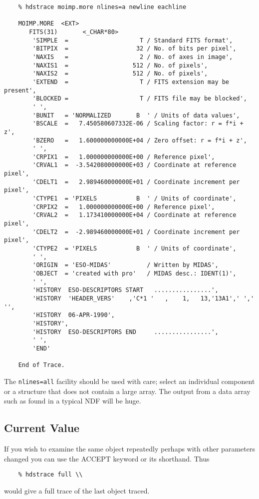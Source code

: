 \small
\begin{verbatim}
    % hdstrace moimp.more nlines=a newline eachline

    MOIMP.MORE  <EXT>
       FITS(31)       <_CHAR*80>      
        'SIMPLE  =                    T / Standard FITS format',
        'BITPIX  =                   32 / No. of bits per pixel',
        'NAXIS   =                    2 / No. of axes in image',
        'NAXIS1  =                  512 / No. of pixels',
        'NAXIS2  =                  512 / No. of pixels',
        'EXTEND  =                    T / FITS extension may be present',
        'BLOCKED =                    T / FITS file may be blocked',
        ' ',
        'BUNIT   = 'NORMALIZED       B  ' / Units of data values',
        'BSCALE  =   7.450580607332E-06 / Scaling factor: r = f*i + z',
        'BZERO   =   1.600000000000E+04 / Zero offset: r = f*i + z',
        ' ',
        'CRPIX1  =   1.000000000000E+00 / Reference pixel',
        'CRVAL1  =  -3.542080000000E+03 / Coordinate at reference pixel',
        'CDELT1  =   2.989460000000E+01 / Coordinate increment per pixel',
        'CTYPE1  = 'PIXELS           B  ' / Units of coordinate',
        'CRPIX2  =   1.000000000000E+00 / Reference pixel',
        'CRVAL2  =   1.173410000000E+04 / Coordinate at reference pixel',
        'CDELT2  =  -2.989460000000E+01 / Coordinate increment per pixel',
        'CTYPE2  = 'PIXELS           B  ' / Units of coordinate',
        ' ',
        'ORIGIN  = 'ESO-MIDAS'          / Written by MIDAS',
        'OBJECT  = 'created with pro'   / MIDAS desc.: IDENT(1)',
        ' ',
        'HISTORY  ESO-DESCRIPTORS START   ................',
        'HISTORY  'HEADER_VERS'    ,'C*1 '   ,    1,   13,'13A1',' ',' '',
        'HISTORY  06-APR-1990',
        'HISTORY',
        'HISTORY  ESO-DESCRIPTORS END     ................',
        ' ',
        'END'

    End of Trace.
\end{verbatim}
\normalsize
The {\tt nlines=all} facility should be used with care; select an individual
component or a structure that does not contain a large array.  The 
output from a data array such as found in a typical NDF will be huge.

\subsection{Current Value}

If you wish to examine the same object repeatedly perhaps with other
parameters changed you can use the ACCEPT keyword or its shorthand.
Thus
\small
\begin{verbatim}
    % hdstrace full \\
\end{verbatim}
\normalsize
would give a full trace of the last object traced.

